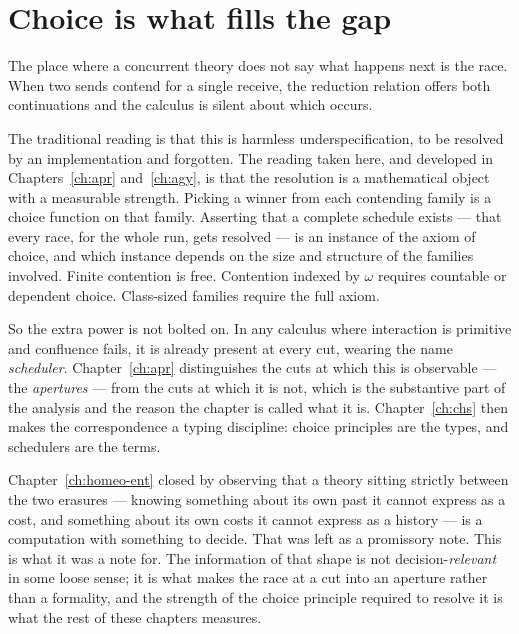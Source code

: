 \section{Choice is what fills the gap}

The place where a concurrent theory does not say what happens next is the
race.
When two sends contend for a single receive, the reduction relation
offers both continuations and the calculus is silent about which occurs.

The traditional reading is that this is harmless underspecification, to be
resolved by an implementation and forgotten.
The reading taken here, and developed in Chapters~\ref{ch:apr}
and~\ref{ch:agy}, is that the resolution is a mathematical object with a
measurable strength.
Picking a winner from each contending family is a choice function on that
family.
Asserting that a complete schedule exists --- that every race, for the
whole run, gets resolved --- is an instance of the axiom of choice, and
which instance depends on the size and structure of the families
involved.
Finite contention is free.
Contention indexed by $\omega$ requires countable or dependent choice.
Class-sized families require the full axiom.

So the extra power is not bolted on.
In any calculus where interaction is primitive and confluence fails, it
is already present at every cut, wearing the name \emph{scheduler}.
Chapter~\ref{ch:apr} distinguishes the cuts at which this is observable
--- the \emph{apertures} --- from the cuts at which it is not, which is
the substantive part of the analysis and the reason the chapter is called
what it is.
Chapter~\ref{ch:chs} then makes the correspondence a typing discipline:
choice principles are the types, and schedulers are the terms.

\begin{remark}
\label{rmk:ent-handoff}
Chapter~\ref{ch:homeo-ent} closed by observing that a theory sitting
strictly between the two erasures --- knowing something about its own past
it cannot express as a cost, and something about its own costs it cannot
express as a history --- is a computation with something to decide.
That was left as a promissory note.
This is what it was a note for.
The information of that shape is not decision-\emph{relevant} in some
loose sense; it is what makes the race at a cut into an aperture rather
than a formality, and the strength of the choice principle required to
resolve it is what the rest of these chapters measures.
\end{remark}

